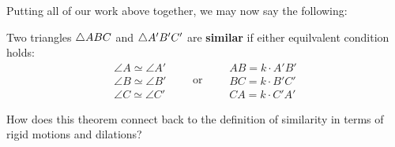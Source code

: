 Putting all of our work above together, we may now say the following:





\begin{theorem} 
Two triangles $\triangle ABC$ and $\triangle A'B'C'$ are 
\textbf{similar} if either equilvalent condition holds:
\[
\begin{array}{l}
\angle A \simeq \angle A'\\
\angle B \simeq \angle B' \\
\angle C \simeq \angle C'
\end{array}
\qquad\text{or}\qquad
\begin{array}{l}
AB = k\cdot A'B'\\
BC = k\cdot B'C' \\
CA = k\cdot C'A'
\end{array}
\]
\end{theorem}

\begin{question}
How does this theorem connect back to the definition of similarity in terms of rigid motions and dilations? 
\end{question}
\QM



%
%
%
%
%

